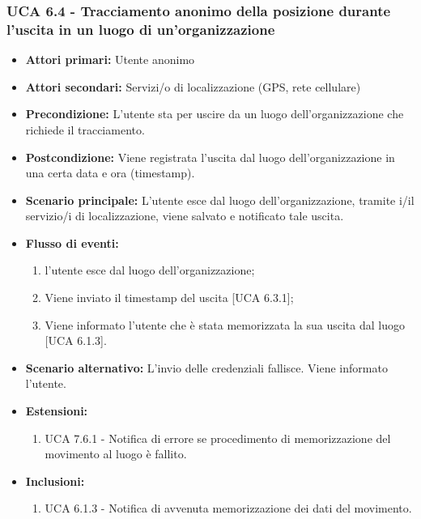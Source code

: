 \subsubsection{UCA 6.4 - Tracciamento anonimo della posizione durante l'uscita in un luogo di un'organizzazione}
\begin{itemize}
	\item \textbf{Attori primari:} Utente anonimo
	\item \textbf{Attori secondari:} Servizi/o di localizzazione (GPS, rete cellulare)
	\item \textbf{Precondizione:} L'utente sta per uscire da un luogo dell'organizzazione che richiede il tracciamento.
	\item \textbf{Postcondizione:} Viene registrata l'uscita dal luogo dell'organizzazione in una certa data e ora (timestamp).
	\item \textbf{Scenario principale:} L'utente esce dal luogo dell'organizzazione, tramite i/il servizio/i di localizzazione, viene salvato e notificato tale uscita. 
	\item \textbf{Flusso di eventi:}
	\begin{enumerate}
		\item l'utente esce dal luogo dell'organizzazione;
		\item Viene inviato il timestamp  del uscita [UCA 6.3.1];
		\item Viene informato l'utente che è stata memorizzata la sua uscita dal luogo [UCA 6.1.3].
	\end{enumerate}
	\item \textbf{Scenario alternativo:} L'invio delle credenziali fallisce. Viene informato l'utente.
	\item \textbf{Estensioni:}
	\begin{enumerate}
		\item UCA 7.6.1 - Notifica di errore se procedimento di memorizzazione del movimento al luogo è fallito.
	\end{enumerate}
	\item \textbf{Inclusioni:}
	\begin{enumerate}
		\item UCA 6.1.3 - Notifica di avvenuta memorizzazione dei dati del movimento.
	\end{enumerate}
\end{itemize}